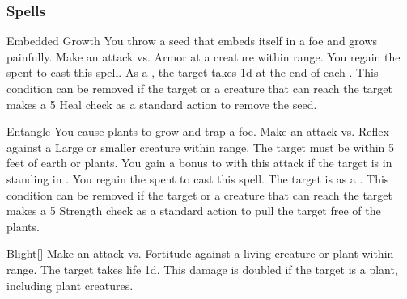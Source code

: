 \subsubsection{Spells}


\lowercase{\hypertarget{spell:Embedded Growth}{}}\label{spell:Embedded Growth}
\begin{apability}[\nth{1}]{\hypertarget{spell:Embedded Growth}{Embedded Growth}}
You throw a seed that embeds itself in a foe and grows painfully.
Make an attack vs. Armor at a creature within \rngclose range.
\miss You regain the  spent to cast this spell.
\hit As a , the target takes  \plus1d at the end of each .
This condition can be removed if the target or a creature that can reach the target makes a  5 Heal check as a standard action to remove the seed.
\end{apability}
\vspace{0.25em}



\lowercase{\hypertarget{spell:Entangle}{}}\label{spell:Entangle}
\begin{apability}[\nth{1}]{\hypertarget{spell:Entangle}{Entangle}}
You cause plants to grow and trap a foe.
Make an attack vs. Reflex against a Large or smaller creature within \rngmed range.
The target must be within 5 feet of earth or plants.
You gain a  bonus to  with this attack if the target is in standing in .
\miss You regain the  spent to cast this spell.
\hit The target is  as a .
This condition can be removed if the target or a creature that can reach the target makes a  5 Strength check as a standard action to pull the target free of the plants.
\end{apability}
\vspace{0.25em}



\lowercase{\hypertarget{spell:Blight}{}}\label{spell:Blight}
\begin{apability}[\nth{2}]{\hypertarget{spell:Blight}{Blight}}[]
Make an attack vs. Fortitude against a living creature or plant within \rngmed range.
\hit The target takes life  \plus1d.
This damage is doubled if the target is a plant, including plant creatures.
\end{apability}
\vspace{0.25em}



